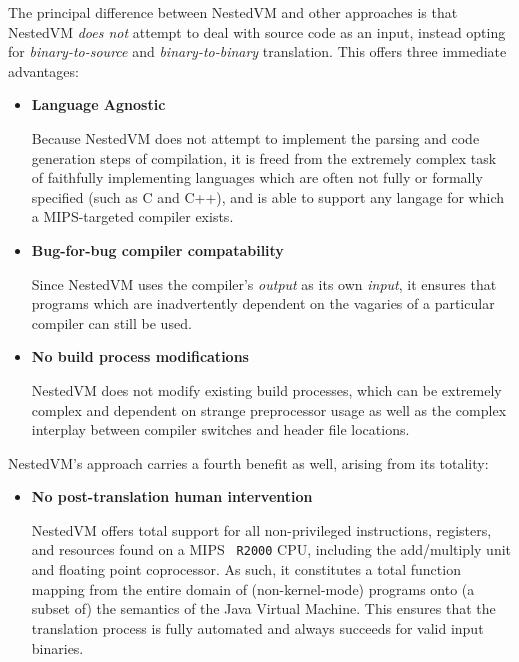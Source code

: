 \documentclass{acmconf}
\begin{document}
The principal difference between NestedVM and other approaches is that
NestedVM {\it does not} attempt to deal with source code as an input,
instead opting for {\it binary-to-source} and {\it binary-to-binary}
translation.  This offers three immediate advantages:

\begin{itemize}
\item {\bf Language Agnostic}

      Because NestedVM does not attempt to implement the parsing and
      code generation steps of compilation, it is freed from the
      extremely complex task of faithfully implementing languages
      which are often not fully or formally specified (such as C and
      C++), and is able to support any langage for which a
      MIPS-targeted compiler exists.

\item {\bf Bug-for-bug compiler compatability}

      Since NestedVM uses the compiler's {\it output} as its own {\it
      input}, it ensures that programs which are inadvertently
      dependent on the vagaries of a particular compiler can still be
      used.

\item {\bf No build process modifications}

      NestedVM does not modify existing build processes, which can be
      extremely complex and dependent on strange preprocessor usage as
      well as the complex interplay between compiler switches and
      header file locations.

\end{itemize}

NestedVM's approach carries a fourth benefit as well, arising from its
totality:

\begin{itemize}
\item {\bf No post-translation human intervention}

      NestedVM offers total support for all non-privileged
      instructions, registers, and resources found on a MIPS {\tt
      R2000} CPU, including the add/multiply unit and floating point
      coprocessor.  As such, it constitutes a total function mapping
      from the entire domain of (non-kernel-mode) programs onto (a
      subset of) the semantics of the Java Virtual Machine.  This
      ensures that the translation process is fully automated and
      always succeeds for valid input binaries.
\end{itemize}
\end{document}
